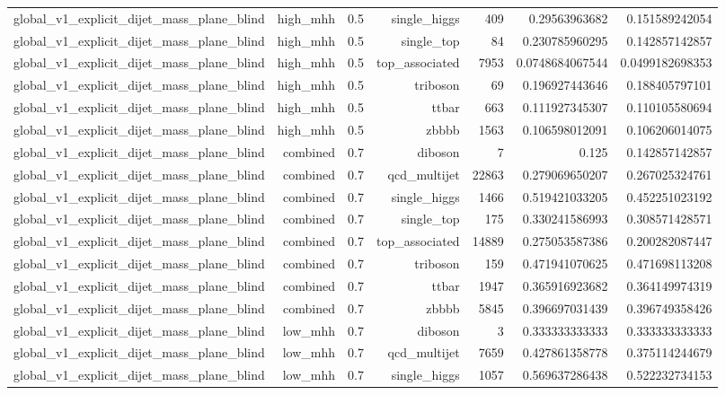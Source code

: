 \begin{table}[htbp]
{\begin{tabular}{lrrrrrr}
global\_v1\_explicit\_dijet\_mass\_plane\_blind & high\_mhh & 0.5 & single\_higgs & 409 & 0.29563963682 & 0.151589242054 \\
global\_v1\_explicit\_dijet\_mass\_plane\_blind & high\_mhh & 0.5 & single\_top & 84 & 0.230785960295 & 0.142857142857 \\
global\_v1\_explicit\_dijet\_mass\_plane\_blind & high\_mhh & 0.5 & top\_associated & 7953 & 0.0748684067544 & 0.0499182698353 \\
global\_v1\_explicit\_dijet\_mass\_plane\_blind & high\_mhh & 0.5 & triboson & 69 & 0.196927443646 & 0.188405797101 \\
global\_v1\_explicit\_dijet\_mass\_plane\_blind & high\_mhh & 0.5 & ttbar & 663 & 0.111927345307 & 0.110105580694 \\
global\_v1\_explicit\_dijet\_mass\_plane\_blind & high\_mhh & 0.5 & zbbbb & 1563 & 0.106598012091 & 0.106206014075 \\
global\_v1\_explicit\_dijet\_mass\_plane\_blind & combined & 0.7 & diboson & 7 & 0.125 & 0.142857142857 \\
global\_v1\_explicit\_dijet\_mass\_plane\_blind & combined & 0.7 & qcd\_multijet & 22863 & 0.279069650207 & 0.267025324761 \\
global\_v1\_explicit\_dijet\_mass\_plane\_blind & combined & 0.7 & single\_higgs & 1466 & 0.519421033205 & 0.452251023192 \\
global\_v1\_explicit\_dijet\_mass\_plane\_blind & combined & 0.7 & single\_top & 175 & 0.330241586993 & 0.308571428571 \\
global\_v1\_explicit\_dijet\_mass\_plane\_blind & combined & 0.7 & top\_associated & 14889 & 0.275053587386 & 0.200282087447 \\
global\_v1\_explicit\_dijet\_mass\_plane\_blind & combined & 0.7 & triboson & 159 & 0.471941070625 & 0.471698113208 \\
global\_v1\_explicit\_dijet\_mass\_plane\_blind & combined & 0.7 & ttbar & 1947 & 0.365916923682 & 0.364149974319 \\
global\_v1\_explicit\_dijet\_mass\_plane\_blind & combined & 0.7 & zbbbb & 5845 & 0.396697031439 & 0.396749358426 \\
global\_v1\_explicit\_dijet\_mass\_plane\_blind & low\_mhh & 0.7 & diboson & 3 & 0.333333333333 & 0.333333333333 \\
global\_v1\_explicit\_dijet\_mass\_plane\_blind & low\_mhh & 0.7 & qcd\_multijet & 7659 & 0.427861358778 & 0.375114244679 \\
global\_v1\_explicit\_dijet\_mass\_plane\_blind & low\_mhh & 0.7 & single\_higgs & 1057 & 0.569637286438 & 0.522232734153 \\

\end{tabular}}
\end{table}
